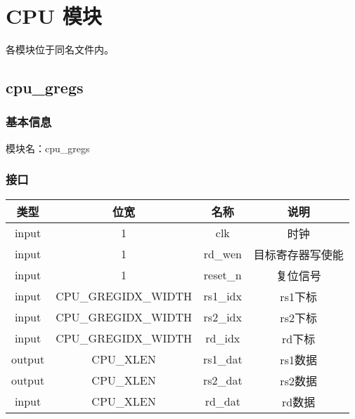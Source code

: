 %
%
%
%
%
%
%
%

\chapter{CPU 模块}
各模块位于同名文件内。

\section{cpu\_gregs}
\subsection{基本信息}
模块名：cpu\_gregs
\subsection{接口}
\begin{tabular}{|c|c|c|c|}
    \hline
    类型    &   位宽    &   名称    &   说明\\\hline
    input   &   1   &   clk &   时钟\\\hline
    input   &   1   &   rd\_wen  &   目标寄存器写使能\\\hline
    input   &   1   &   reset\_n  &   复位信号\\\hline
    input   &   CPU\_GREGIDX\_WIDTH &   rs1\_idx    &   rs1下标\\\hline
    input   &   CPU\_GREGIDX\_WIDTH &   rs2\_idx    &   rs2下标\\\hline
    input   &   CPU\_GREGIDX\_WIDTH &   rd\_idx    &   rd下标\\\hline
    output   &   CPU\_XLEN &   rs1\_dat    &   rs1数据\\\hline
    output   &   CPU\_XLEN &   rs2\_dat    &   rs2数据\\\hline
    input   &   CPU\_XLEN &   rd\_dat    &   rd数据\\\hline
\end{tabular}
